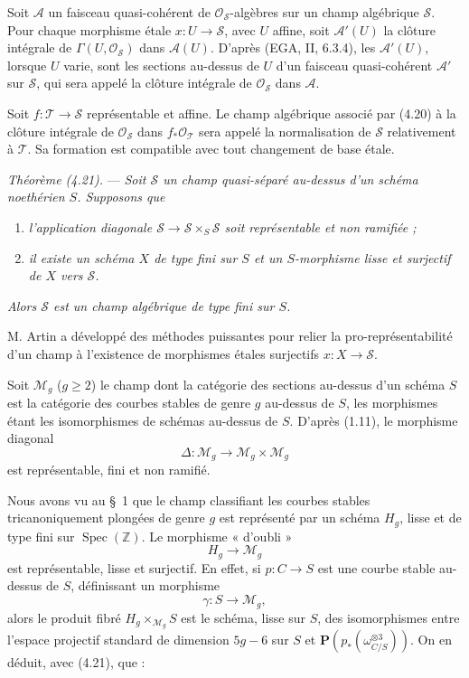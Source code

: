 \documentclass[10pt]{article}
\newcommand{\Spec}{\operatorname{Spec}}
\newcommand{\cO}{\mathcal O}
\newcommand{\PP}{\mathbf P}
\begin{document}
Soit $\mathscr A$ un faisceau quasi-cohérent de $\cO_{\mathscr S}$-algèbres sur un champ algébrique $\mathscr S$. Pour chaque morphisme étale $x:U\to\mathscr S$, avec $U$ affine, soit $\mathscr A'(U)$ la clôture intégrale de $\Gamma(U,\cO_{\mathscr S})$ dans $\mathscr A(U)$. D'après (EGA, II, 6.3.4), les $\mathscr A'(U)$, lorsque $U$ varie, sont les sections au-dessus de $U$ d'un faisceau quasi-cohérent $\mathscr A'$ sur $\mathscr S$, qui sera appelé la clôture intégrale de $\cO_{\mathscr S}$ dans $\mathscr A$.

Soit $f:\mathscr T\to\mathscr S$ représentable et affine. Le champ algébrique associé par (4.20) à la clôture intégrale de $\cO_{\mathscr S}$ dans $f_*\cO_{\mathscr T}$ sera appelé la normalisation de $\mathscr S$ relativement à $\mathscr T$. Sa formation est compatible avec tout changement de base étale.

\medskip
\noindent\emph{Théorème (4.21).} --- \emph{Soit $\mathscr S$ un champ quasi-séparé au-dessus d'un schéma noethérien $S$. Supposons que}
\begin{enumerate}[label=(\roman*)]
\item \emph{l'application diagonale $\mathscr S\to\mathscr S\times_S\mathscr S$ soit représentable et non ramifiée ;}
\item \emph{il existe un schéma $X$ de type fini sur $S$ et un $S$-morphisme lisse et surjectif de $X$ vers $\mathscr S$.}
\end{enumerate}
\emph{Alors $\mathscr S$ est un champ algébrique de type fini sur $S$.}

M. Artin a développé des méthodes puissantes pour relier la pro-représentabilité d'un champ à l'existence de morphismes étales surjectifs $x:X\to\mathscr S$.

\medskip
{}

Soit $\mathcal M_g$ ($g\geq 2$) le champ dont la catégorie des sections au-dessus d'un schéma $S$ est la catégorie des courbes stables de genre $g$ au-dessus de $S$, les morphismes étant les isomorphismes de schémas au-dessus de $S$. D'après (1.11), le morphisme diagonal
\[
\Delta:\mathcal M_g\longrightarrow \mathcal M_g\times\mathcal M_g
\]
est représentable, fini et non ramifié.

Nous avons vu au \S~1 que le champ classifiant les courbes stables tricanoniquement plongées de genre $g$ est représenté par un schéma $H_g$, lisse et de type fini sur $\Spec(\mathbb Z)$. Le morphisme « d'oubli »
\[
H_g\longrightarrow \mathcal M_g
\]
est représentable, lisse et surjectif. En effet, si $p:C\to S$ est une courbe stable au-dessus de $S$, définissant un morphisme
\[
\gamma:S\longrightarrow \mathcal M_g,
\]
alors le produit fibré $H_g\times_{\mathcal M_g}S$ est le schéma, lisse sur $S$, des isomorphismes entre l'espace projectif standard de dimension $5g-6$ sur $S$ et $\PP(p_*(\omega_{C/S}^{\otimes 3}))$. On en déduit, avec (4.21), que :
\end{document}
